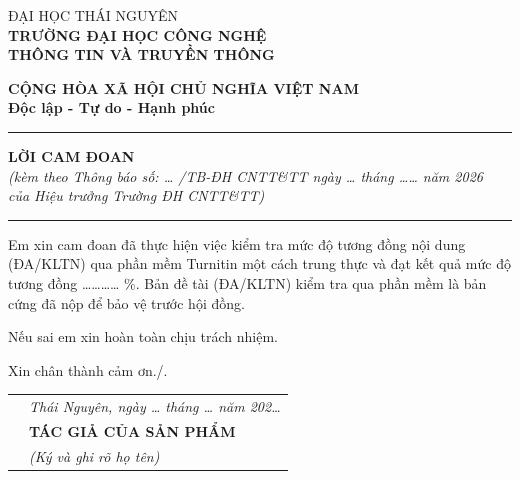 \vspace*{5pt}


\noindent
\begin{minipage}[t]{0.45\textwidth}
    \centering
            ĐẠI HỌC THÁI NGUYÊN \\
    \textbf{TRƯỜNG ĐẠI HỌC CÔNG NGHỆ} \\
    \textbf{THÔNG TIN VÀ TRUYỀN THÔNG}
\end{minipage}%
\begin{minipage}[t]{0.59\textwidth}
    \centering
    \textbf{CỘNG HÒA XÃ HỘI CHỦ NGHĨA VIỆT NAM} \\
    \textbf{Độc lập - Tự do - Hạnh phúc} \\
    \setlength{\baselineskip}{10truept}
    \rule{0.4\linewidth}{0.4pt}
\end{minipage}

\vspace{1cm}

\begin{center}
    \textbf{\large LỜI CAM ĐOAN}\\[0.3cm]
    \textit{(kèm theo Thông báo số: \ldots{} /TB-ĐH CNTT\&TT ngày \ldots{} tháng \ldots\ldots{} năm 2026}\\
    \textit{của Hiệu trưởng Trường ĐH CNTT\&TT)}\\[0.1cm]
    \setlength{\baselineskip}{10truept}
    \rule{0.4\textwidth}{0.4pt}
\end{center}

\vspace{0.5cm}

{
\setlength{\baselineskip}{28truept}
\hspace{1cm} Em xin cam đoan đã thực hiện việc kiểm tra mức độ tương đồng nội dung (ĐA/KLTN) qua phần mềm Turnitin một cách trung thực và đạt kết quả mức độ tương đồng \ldots\ldots\ldots\ldots{} \%. Bản đề tài (ĐA/KLTN) kiểm tra qua phần mềm là bản cứng đã nộp để bảo vệ trước hội đồng.

\hspace{1cm} Nếu sai em xin hoàn toàn chịu trách nhiệm.

\hspace{1cm} Xin chân thành cảm ơn./.
}

\vspace{1cm}

\begin{tabular}{p{} >{\centering\arraybackslash}p{}}
 & \textit{Thái Nguyên, ngày \ldots{} tháng \ldots{} năm 202\ldots} \\[0.5cm]
 & \textbf{TÁC GIẢ CỦA SẢN PHẨM} \\
 & \textit{(Ký và ghi rõ họ tên)} \\[2.5cm]
\end{tabular}
